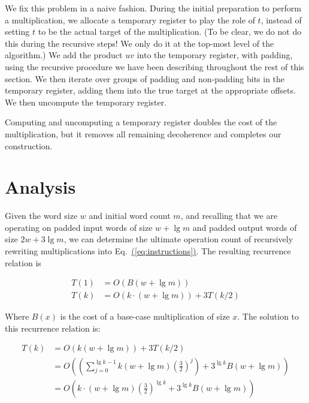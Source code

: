 \documentclass[onecolumn,unpublished]{quantumarticle}
\newcommand{\eq}[1]{Eq.~\hyperref[eq:#1]{(\ref*{eq:#1})}}
\begin{document}
We fix this problem in a naive fashion.
During the initial preparation to perform a multiplication, we allocate a temporary register to play the role of $t$, instead of setting $t$ to be the actual target of the multiplication.
(To be clear, we do not do this during the recursive steps!
We only do it at the top-most level of the algorithm.)
We add the product $uv$ into the temporary register, with padding, using the recursive procedure we have been describing throughout the rest of this section.
We then iterate over groups of padding and non-padding bits in the temporary register, adding them into the true target at the appropriate offsets.
We then uncompute the temporary register.

Computing and uncomputing a temporary register doubles the cost of the multiplication, but it removes all remaining decoherence and completes our construction.


\section{Analysis}
\label{sec:results}

Given the word size $w$ and initial word count $m$, and recalling that we are operating on padded input words of size $w + \lg m$ and padded output words of size $2w + 3 \lg m$, we can determine the ultimate operation count of recursively rewriting multiplications into \eq{instructions}.
The resulting recurrence relation is

\begin{equation}
    \begin{aligned}
        T(1) &= O(B(w + \lg m))
        \\
        T(k) &= O(k \cdot (w + \lg m)) + 3 T(k/2)
    \end{aligned}
\end{equation}

Where $B(x)$ is the cost of a base-case multiplication of size $x$.
The solution to this recurrence relation is:

\begin{equation}
    \begin{aligned}
T(k) &= O(k (w + \lg m)) + 3 T(k/2)
\\   &= O\left(\left(\sum_{j=0}^{\lg k - 1} k (w + \lg m) \left(\frac{3}{2}\right)^j\right) + 3^{\lg k} B(w + \lg m)\right)
\\   &= O\left(k \cdot (w + \lg m) \left(\frac{3}{2}\right)^{\lg k} + 3^{\lg k} B(w + \lg m)\right)
    \end{aligned}
\end{equation}
\end{document}
